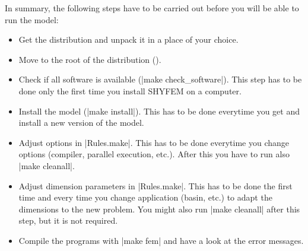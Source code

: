 
In summary, the following steps have to be carried out before you will
be able to run the model:

\begin{itemize}

\item Get the distribution and unpack it in a place of your choice.

\item Move to the root of the distribution ().

\item Check if all software is available (|make check_software|). This
step has to be done only the first time you install SHYFEM on a computer.

\item Install the model (|make install|). This has to be done everytime
you get and install a new version of the model.

\item Adjust options in |Rules.make|. This has to be done everytime you
change options (compiler, parallel execution, etc.). After this you have
to run also |make cleanall|.

\item Adjust dimension parameters in |Rules.make|. This has to be done the
first time and every time you change application (basin, etc.) to adapt
the dimensions to the new problem. You might also run |make cleanall|
after this step, but it is not required.

\item Compile the programs with |make fem| and have a look at the error
messages.

\end{itemize}


